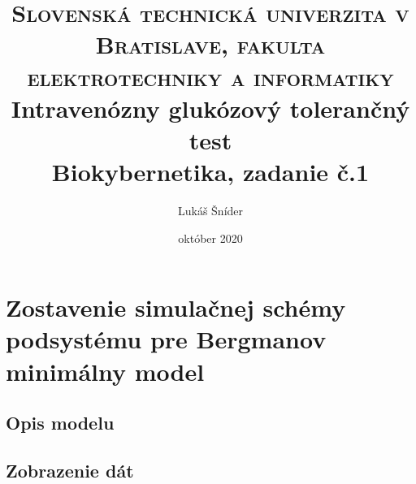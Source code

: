 \documentclass[11pt]{article} %
\title{	
	\normalfont\normalsize
	\textsc{Slovenská technická univerzita v Bratislave, fakulta elektrotechniky a informatiky}\\ %
	\vspace{25pt} %
	\vspace{20pt} %
	\vspace{20pt} %
	\vspace{20pt} %
	\vspace{20pt} %
	\vspace{20pt} %
	\vspace{20pt} %
	\vspace{20pt} %
	\vspace{20pt} %
		\vspace{20pt} %
	\vspace{20pt} %
	\huge Intravenózny glukózový tolerančný test\\ %
	\vspace{12pt} %
	\normalsize Biokybernetika, zadanie č.1
	\vspace{20pt} %
	\vspace{20pt} %
	\vspace{20pt} %
		\vspace{20pt} %
	\vspace{20pt} %
		\vspace{20pt} %
	\vspace{20pt} %
		\vspace{20pt} %
	\vspace{20pt} %
	\vspace{20pt} %
	\vspace{20pt} %
		\vspace{20pt} %
	\vspace{20pt} %
	\vspace{12pt} %
}
\author{\LARGE Lukáš Šníder} %
\date{október 2020}
\begin{document}
\maketitle %
\thispagestyle{empty}
\clearpage
\setcounter{page}{1}

\section{Zostavenie simulačnej schémy podsystému pre Bergmanov minimálny model}

\subsection{Opis modelu}

%

\subsection{Zobrazenie dát}
\end{document}
